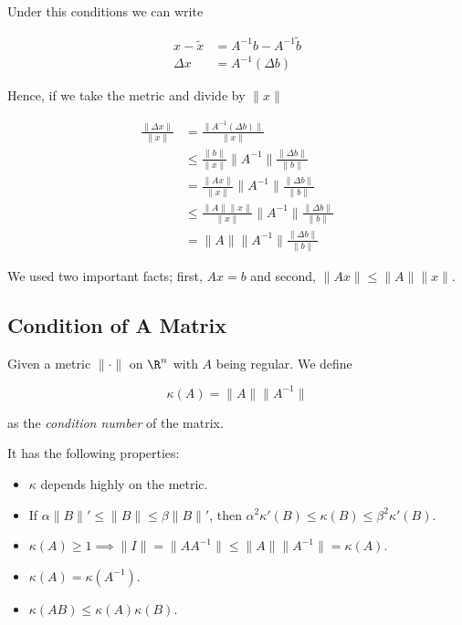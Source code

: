 Under this conditions we can write 

\begin{align*}
    x - \tilde{x} &= A^{-1}b - A^{-1}\tilde{b}\\ 
    \Delta x & = A^{-1}(\Delta b)
\end{align*}

Hence, if we take the metric and divide by \(\|x\|\)

\begin{align*} 
    \frac{\|\Delta x\|}{\|x\|} &= \frac{\|A^{-1}(\Delta b)\|}{\|x\|} \\ 
                               &\le \frac{\|b\|}{\|x\|} \|A^{-1}\| \frac{\|\Delta b\|}{\|b\|} \\   
                               &= \frac{\|Ax\|}{\|x\|} \|A^{-1}\| \frac{\|\Delta b\|}{\|b\|} \\ 
                               &\le \frac{\|A\|\|x\|}{\|x\|} \|A^{-1}\| \frac{\|\Delta b\|}{\|b\|} \\ 
                               &= \|A\| \|A^{-1}\| \frac{\|\Delta b\|}{\|b\|}
\end{align*}

We used two important facts; first, \(Ax = b\) and second, \(\|Ax\| \le \|A\|\|x\|\).

\subsection{Condition of A Matrix}

Given a metric \(\|\cdot \|\) on \(\R^n\) with \(A\) being regular. We define 

\[
    \kappa(A) = \|A\|\|A^{-1}\|
\] 

as the \emph{condition number} of the matrix.

It has the following properties: 

\begin{itemize}
   
    \item \(\kappa\) depends highly on the metric. 
    
    \item If \(\alpha \|B\|' \le \|B\| \le \beta \|B\|'\), then \(\alpha^2 \kappa '(B) \le \kappa(B) \le \beta^2\kappa '(B)\).
    
    \item \(\kappa(A) \ge 1 \implies \|I\| = \|A A^{-1}\| \le \|A\| \|A^{-1}\| = \kappa(A)\).

    \item \(\kappa(A) = \kappa(A^{-1})\). 

    \item \(\kappa(AB) \le \kappa(A)\kappa(B)\).

\end{itemize}


